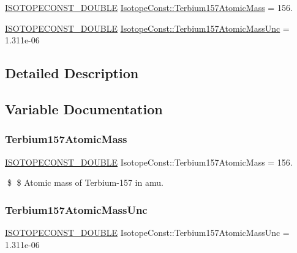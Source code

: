 \begin{DoxyCompactItemize}
\item 
\mbox{\hyperlink{group___isotope_const-_macros_ga8f45a7272ce02c0b4c65c44636ed719a}{I\+S\+O\+T\+O\+P\+E\+C\+O\+N\+S\+T\+\_\+\+D\+O\+U\+B\+LE}} \mbox{\hyperlink{group___isotope_const-_terbium-_tb157_gaac4817d51d635b0d590cfd6a763f44ee}{Isotope\+Const\+::\+Terbium157\+Atomic\+Mass}} = 156.
\item 
\mbox{\hyperlink{group___isotope_const-_macros_ga8f45a7272ce02c0b4c65c44636ed719a}{I\+S\+O\+T\+O\+P\+E\+C\+O\+N\+S\+T\+\_\+\+D\+O\+U\+B\+LE}} \mbox{\hyperlink{group___isotope_const-_terbium-_tb157_ga80d2a49f1e6780f96b2ba06e9952bc24}{Isotope\+Const\+::\+Terbium157\+Atomic\+Mass\+Unc}} = 1.\+311e-\/06
\end{DoxyCompactItemize}


\subsection{Detailed Description}


\subsection{Variable Documentation}
\mbox{\label{group___isotope_const-_terbium-_tb157_gaac4817d51d635b0d590cfd6a763f44ee}} 
\subsubsection{\texorpdfstring{Terbium157\+Atomic\+Mass}{Terbium157AtomicMass}}
{\footnotesize\ttfamily \mbox{\hyperlink{group___isotope_const-_macros_ga8f45a7272ce02c0b4c65c44636ed719a}{I\+S\+O\+T\+O\+P\+E\+C\+O\+N\+S\+T\+\_\+\+D\+O\+U\+B\+LE}} Isotope\+Const\+::\+Terbium157\+Atomic\+Mass = 156.}

\$ \$ Atomic mass of Terbium-\/157 in amu. \mbox{\label{group___isotope_const-_terbium-_tb157_ga80d2a49f1e6780f96b2ba06e9952bc24}} 
\subsubsection{\texorpdfstring{Terbium157\+Atomic\+Mass\+Unc}{Terbium157AtomicMassUnc}}
{\footnotesize\ttfamily \mbox{\hyperlink{group___isotope_const-_macros_ga8f45a7272ce02c0b4c65c44636ed719a}{I\+S\+O\+T\+O\+P\+E\+C\+O\+N\+S\+T\+\_\+\+D\+O\+U\+B\+LE}} Isotope\+Const\+::\+Terbium157\+Atomic\+Mass\+Unc = 1.\+311e-\/06}


